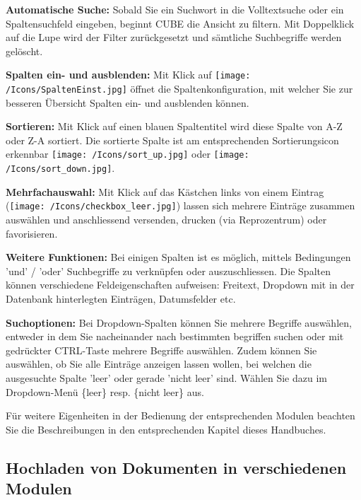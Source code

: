 \begin{compactitem}
	\item \textbf{Automatische Suche:} Sobald Sie ein Suchwort in die Volltextsuche oder ein Spaltensuchfeld eingeben, beginnt CUBE die Ansicht zu filtern. Mit Doppelklick auf die Lupe wird der Filter zurückgesetzt und sämtliche Suchbegriffe werden gelöscht.
	\item \textbf{Spalten ein- und ausblenden:} Mit Klick auf \texttt{[image: /Icons/SpaltenEinst.jpg]} öffnet die Spaltenkonfiguration, mit welcher Sie zur besseren Übersicht Spalten ein- und ausblenden können.
	\item \textbf{Sortieren:} Mit Klick auf einen blauen Spaltentitel wird diese Spalte von A-Z oder Z-A sortiert. Die sortierte Spalte ist am entsprechenden Sortierungsicon erkennbar \texttt{[image: /Icons/sort\_up.jpg]} oder \texttt{[image: /Icons/sort\_down.jpg]}.
		\item \textbf{Mehrfachauswahl:} Mit Klick auf das Kästchen links von einem Eintrag (\texttt{[image: /Icons/checkbox\_leer.jpg]}) lassen sich mehrere Einträge zusammen auswählen und anschliessend versenden, drucken (via Reprozentrum) oder favorisieren.
	\item \textbf{Weitere Funktionen:} Bei einigen Spalten ist es möglich, mittels Bedingungen 'und' / 'oder' Suchbegriffe zu verknüpfen oder auszuschliessen. Die Spalten können verschiedene Feldeigenschaften aufweisen: Freitext, Dropdown mit in der Datenbank hinterlegten Einträgen, Datumsfelder etc.
	\item \textbf{Suchoptionen:} Bei Dropdown-Spalten können Sie mehrere Begriffe auswählen, entweder in dem Sie nacheinander nach bestimmten begriffen suchen oder mit gedrückter CTRL-Taste mehrere Begriffe auswählen. Zudem können Sie auswählen, ob Sie alle Einträge anzeigen lassen wollen, bei welchen die ausgesuchte Spalte 'leer' oder gerade 'nicht leer' sind. Wählen Sie dazu im Dropdown-Menü \{leer\} resp. \{nicht leer\} aus. 
\end{compactitem}	

\vspace{\baselineskip}

Für weitere Eigenheiten in der Bedienung der entsprechenden Modulen beachten Sie die Beschreibungen in den entsprechenden Kapitel dieses Handbuches.

\subsection{Hochladen von Dokumenten in verschiedenen Modulen}

